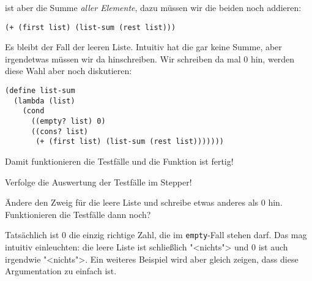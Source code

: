 ist aber die Summe \emph{aller Elemente}, dazu müssen wir die beiden
noch addieren:
%
\begin{lstlisting}
(+ (first list) (list-sum (rest list)))
\end{lstlisting}
%
Es bleibt der Fall der leeren Liste.  Intuitiv hat die gar keine
Summe, aber irgendetwas müssen wir da hinschreiben.  Wir schreiben da
mal 0 hin, werden diese Wahl aber noch diskutieren:
%
\begin{lstlisting}
(define list-sum
  (lambda (list)
    (cond
      ((empty? list) 0)
      ((cons? list)
       (+ (first list) (list-sum (rest list)))))))
\end{lstlisting}
%
Damit funktionieren die Testfälle und die Funktion ist fertig!

\begin{aufgabe}
  Verfolge die Auswertung der Testfälle im Stepper!
\end{aufgabe}

\begin{aufgabe}
  Ändere den Zweig für die leere Liste und schreibe etwas anderes als
  0 hin.  Funktionieren die Testfälle dann noch?
\end{aufgabe}
%
Tatsächlich ist 0 die einzig richtige Zahl, die im
\lstinline{empty}-Fall stehen darf.  Das mag intuitiv einleuchten: die
leere Liste ist schließlich "<nichts"> und 0 ist auch irgendwie
"<nichts">.  Ein weiteres Beispiel wird aber gleich zeigen, dass diese
Argumentation zu einfach ist.

